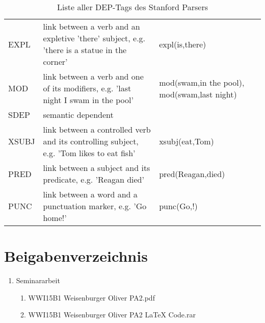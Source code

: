 \begin{table}[h!]
\begin{tabular}{|l|l|l|l|}
   EXPL & link between a verb and an expletive 'there' subject, e.g. 'there is a statue in the corner' & expl(is,there)\\
   MOD & link between a verb and one of its modifiers, e.g. 'last night I swam in the pool' & mod(swam,in the pool), mod(swam,last night)\\
   SDEP & semantic dependent\\
       XSUBJ & link between a controlled verb and its controlling subject, e.g. 'Tom likes to eat fish' & xsubj(eat,Tom)\\
   PRED & link between a subject and its predicate, e.g. 'Reagan died' & pred(Reagan,died)\\
   PUNC & link between a word and a punctuation marker, e.g. 'Go home!' & punc(Go,!)\\

	\bottomrule
  \end{tabular}
  \caption{Liste aller DEP-Tags des Stanford Parsers}
  \label{table:DEPTAGS}
\end{table}

\section{Beigabenverzeichnis}
\begin{enumerate}
	\item Seminararbeit
	\begin{enumerate}
		\item WWI15B1 Weisenburger Oliver PA2.pdf
		\item WWI15B1 Weisenburger Oliver PA2 LaTeX Code.rar
	\end{enumerate}

\end{enumerate} 

